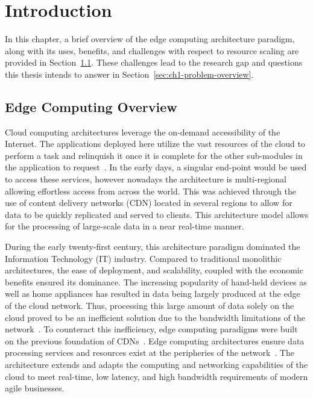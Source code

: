 \clearpage

\def\chaptertitle{Introduction}

\lhead{\emph{\chaptertitle}}

\chapter{\chaptertitle}
\label{ch:introduction}

In this chapter, a brief overview of the edge computing architecture paradigm, along with its uses, benefits, and challenges with respect to resource scaling are provided in Section~\ref{sec:ch1-edge-arch}. These challenges lead to the research gap and questions this thesis intends to answer in Section~\ref{sec:ch1-problem-overview}.\par

\section{Edge Computing Overview}
\label{sec:ch1-edge-arch}

Cloud computing architectures leverage the on-demand accessibility of the Internet. The applications deployed here utilize the vast resources of the cloud to perform a task and relinquish it once it is complete for the other sub-modules in the application to request~\cite{rimal2009taxonomy}. In the early days, a singular end-point would be used to access these services, however nowadays the architecture is multi-regional allowing effortless access from across the world. This was achieved through the use of content delivery networks (CDN) located in several regions to allow for data to be quickly replicated and served to clients. This architecture model allows for the processing of large-scale data in a near real-time manner.\par

During the early twenty-first century, this architecture paradigm dominated the Information Technology (IT) industry. Compared to traditional monolithic architectures, the ease of deployment, and scalability, coupled with the economic benefits ensured its dominance. The increasing popularity of hand-held devices as well as home appliances has resulted in data being largely produced at the edge of the cloud network. Thus, processing this large amount of data solely on the cloud proved to be an inefficient solution due to the bandwidth limitations of the network~\cite{shi2016edge}. To counteract this inefficiency, edge computing paradigms were built on the previous foundation of CDNs~\cite{satyanarayanan2017emergence}. Edge computing architectures ensure data processing services and resources exist at the peripheries of the network~\cite{cao2020overview}. The architecture extends and adapts the computing and networking capabilities of the cloud to meet real-time, low latency, and high bandwidth requirements of modern agile businesses.\par

